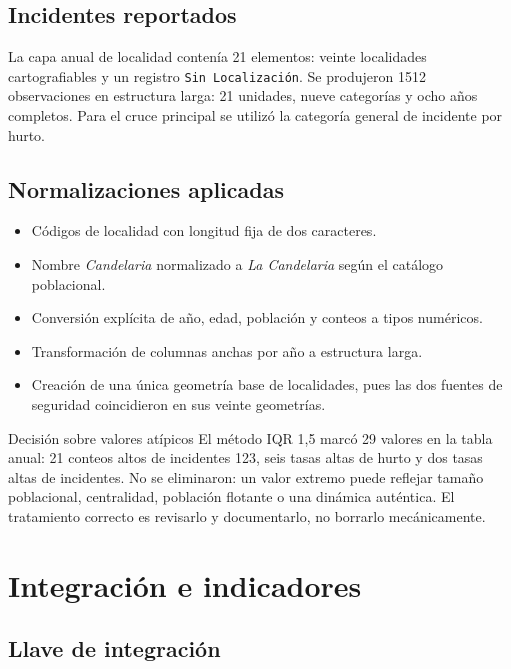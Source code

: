 \documentclass[11pt,letterpaper,oneside]{report}
\begin{document}
\section{Incidentes reportados}

La capa anual de localidad contenía 21 elementos: veinte localidades cartografiables y un registro \texttt{Sin Localización}. Se produjeron \num{1512} observaciones en estructura larga: 21 unidades, nueve categorías y ocho años completos. Para el cruce principal se utilizó la categoría general de incidente por hurto.

\section{Normalizaciones aplicadas}

\begin{itemize}
  \item Códigos de localidad con longitud fija de dos caracteres.
  \item Nombre \textit{Candelaria} normalizado a \textit{La Candelaria} según el catálogo poblacional.
  \item Conversión explícita de año, edad, población y conteos a tipos numéricos.
  \item Transformación de columnas anchas por año a estructura larga.
  \item Creación de una única geometría base de localidades, pues las dos fuentes de seguridad coincidieron en sus veinte geometrías.
\end{itemize}

\begin{warningbox}{Decisión sobre valores atípicos}
El método IQR 1,5 marcó 29 valores en la tabla anual: 21 conteos altos de incidentes 123, seis tasas altas de hurto y dos tasas altas de incidentes. No se eliminaron: un valor extremo puede reflejar tamaño poblacional, centralidad, población flotante o una dinámica auténtica. El tratamiento correcto es revisarlo y documentarlo, no borrarlo mecánicamente.
\end{warningbox}

\chapter{Integración e indicadores}\label{chap:integracion}

\section{Llave de integración}
\end{document}
